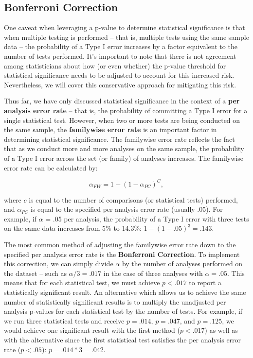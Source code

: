 \documentclass[
]{book}
\begin{document}
\hypertarget{bonferroni-correction}{%
\subsection{Bonferroni Correction}\label{bonferroni-correction}}

One caveat when leveraging a p-value to determine statistical significance is that when multiple testing is performed -- that is, multiple tests using the same sample data -- the probability of a Type I error increases by a factor equivalent to the number of tests performed. It's important to note that there is not agreement among statisticians about how (or even whether) the p-value threshold for statistical significance needs to be adjusted to account for this increased risk. Nevertheless, we will cover this conservative approach for mitigating this risk.

Thus far, we have only discussed statistical significance in the context of a \textbf{per analysis error rate} -- that is, the probability of committing a Type I error for a single statistical test. However, when two or more tests are being conducted on the same sample, the \textbf{familywise error rate} is an important factor in determining statistical significance. The familywise error rate reflects the fact that as we conduct more and more analyses on the same sample, the probability of a Type I error across the set (or family) of analyses increases. The familywise error rate can be calculated by:

\[ \alpha_{FW} = 1 - (1 - \alpha_{PC})^C,  \]

where \(c\) is equal to the number of comparisons (or statistical tests) performed, and \(\alpha_{PC}\) is equal to the specified per analysis error rate (usually .05). For example, if \(\alpha\) = .05 per analysis, the probability of a Type I error with three tests on the same data increases from 5\% to 14.3\%: \(1 - (1 - .05)^3 = .143\).

The most common method of adjusting the familywise error rate down to the specified per analysis error rate is the \textbf{Bonferroni Correction}. To implement this correction, we can simply divide \(\alpha\) by the number of analyses performed on the dataset -- such as \(\alpha / 3 = .017\) in the case of three analyses with \(\alpha = .05\). This means that for each statistical test, we must achieve \(p < .017\) to report a statistically significant result. An alternative which allows us to achieve the same number of statistically significant results is to multiply the unadjusted per analysis p-values for each statistical test by the number of tests. For example, if we run three statistical tests and receive \(p = .014\), \(p = .047\), and \(p = .125\), we would achieve one significant result with the first method (\(p < .017\)) as well as with the alternative since the first statistical test satisfies the per analysis error rate (\(p < .05\)): \(p = .014 * 3 = .042\).
\end{document}
